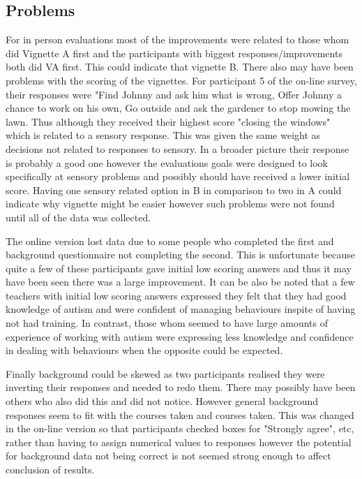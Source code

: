 \subsection*{Problems}
For in person evaluations most of the improvements were related to those whom did Vignette A first and the participants with biggest responses/improvements both did VA first. This could indicate that vignette B. There also may have been problems with the scoring of the vignettes. For participant 5 of the on-line survey, their responses were "Find Johnny and ask him what is wrong, Offer Johnny a chance to work on his own, Go outside and ask the gardener to stop mowing the lawn. Thus although they received their highest score "closing the windows" which is related to a sensory response. This was given the same weight as decisions not related to responses to sensory. In a broader picture their response is probably a good one however the evaluations goals were designed to look specifically at sensory problems and possibly should have received a lower initial score. Having one sensory related option in B in comparison to two in A could indicate why vignette might be easier however such problems were not found until all of the data was collected. 

The online version lost data due to some people who completed the first and background questionnaire not completing the second. This is unfortunate because quite a few of these participants gave initial low scoring answers and thus it may have been seen there was a large improvement. It can be also be noted that a few teachers with initial low scoring answers expressed they felt that they had good knowledge of autism and were confident of managing behaviours inspite of having not had training. In contrast, those whom seemed to have large amounts of experience of working with autism were expressing less knowledge and confidence in dealing with behaviours when the opposite could be expected. 

Finally background could be skewed as two participants realised they were inverting their responses and needed to redo them. There may possibly have been others who also did this and did not notice. However general background responses seem to fit with the courses taken and courses taken. This was changed in the on-line version so that participants checked boxes for "Strongly agree", etc, rather than having to assign numerical values to responses however the potential for background data not being correct is not seemed strong enough to affect conclusion of results. 

